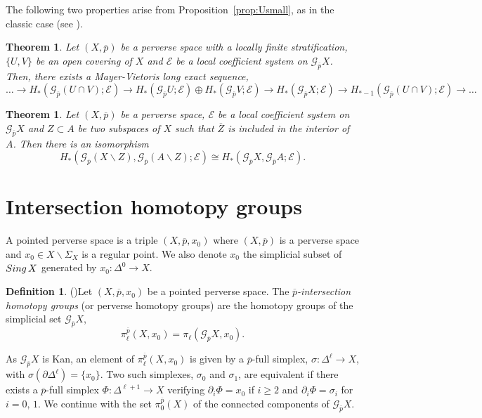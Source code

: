 \documentclass[a4paper,10pt,english,reqno]{amsart}
\theoremstyle{plain}
\newtheorem{theoremb}[proposition]{Theorem}
\theoremstyle{definition}
\newtheorem{definition}[proposition]{Definition}
\theoremstyle{remark}
\numberwithin{equation}{section}
\newcommand{\propref}[1]{Proposition~\ref{#1}}
\def\ov{\overline}
\def\cE{{\mathcal E}}
\def\crG{{\mathscr G}}
\def\sing{{\rm Sing}}
\def\menos{\backslash}
\renewcommand\1{\hbox{\ding{192}}}
\renewcommand\2{\hbox{\ding{193}}}
\newcommand\3{\hbox{\ding{194}}}
\newcommand\4{\hbox{\ding{195}}}
\begin{document}
The following two properties arise from \propref{prop:Usmall}, as in the classic case (see \cite[Chapter 6]{MR957919}).

\begin{theoremb}\label{thm:MV}
Let $(X,\ov{p})$ be a  perverse space with a locally finite stratification,
$\{U,V\}$ be an open covering of $X$ and 
$\cE$ be a local coefficient system on $\crG_{\ov{p}}X$. 
Then, there exists a Mayer-Vietoris long exact sequence, 
$$
\dots \to
H_{*}(\crG_{\ov p} (U \cap V);\cE) \to H_{*}(\crG_{\ov p} U;\cE) \oplus H_{*}(\crG_{\ov p} V;\cE)  \to  
H_{*}(\crG_{\ov p} X  ;\cE) 
\to  H_{*-1}(\crG_{\ov p} (U \cap V);\cE)  \to  \dots 
$$
\end{theoremb}



\begin{theoremb}\label{thm:excision}
Let $(X,\ov{p})$ be a perverse space, $\cE$ be a local coefficient system on $\crG_{\ov{p}}X$
and $Z\subset A$ be two subspaces of $X$ 
such that $\ov{Z}$ is included in the interior of $A$. Then there is an isomorphism
$$H_{*}(\crG_{\ov{p}}(X\menos Z),\crG_{\ov{p}}(A\menos Z);\cE)\cong
H_{*}(\crG_{\ov{p}}X,\crG_{\ov{p}}A;\cE).$$
\end{theoremb}






\section{Intersection homotopy groups}
 
A pointed perverse space is a triple $(X,\ov{p},x_{0})$ where $(X,\ov{p})$ is a perverse space and 
$x_{0}\in X\menos \Sigma_{X}$ is a regular point.
We also denote $x_{0}$ the simplicial subset of $\sing\, X$ generated by $x_{0}\colon \Delta^0\to X$.

%
\begin{definition}{(\cite{MR1404919})}\label{def:intersectionhomotopygp}
Let $(X,\ov{p},x_{0})$ be a pointed perverse space.
The \emph{$\ov{p}$-intersection homotopy  groups}
%
(or perverse homotopy groups)
%
are the homotopy groups of the simplicial set $\crG_{\ov{p}}X$,
$$\pi^{\ov{p}}_{\ell}(X,x_{0})=\pi_{\ell}(\crG_{\ov{p}}X,x_{0}).$$
\end{definition}

As $\crG_{\ov{p}}X$ is Kan, an element of $\pi^{\ov{p}}_{\ell}(X,x_{0})$ is given by a $\ov{p}$-full simplex, 
$\sigma\colon \Delta^\ell\to X$, with $\sigma(\partial\Delta^\ell)=\{x_{0}\}$.
Two such simplexes, $\sigma_{0}$ and $\sigma_{1}$, are equivalent if there exists a $\ov{p}$-full simplex
$\Phi\colon \Delta^{\ell+1}\to X$ verifying
$\partial_{i}\Phi=x_{0}$ if $i\geq 2$ and $\partial_{i}\Phi=\sigma_{i}$ for $i=0,\,1$.
%
We continue with the set $\pi_{0}^{\ov{p}}(X)$ of the connected components of $\crG_{\ov p} X$.
\end{document}
